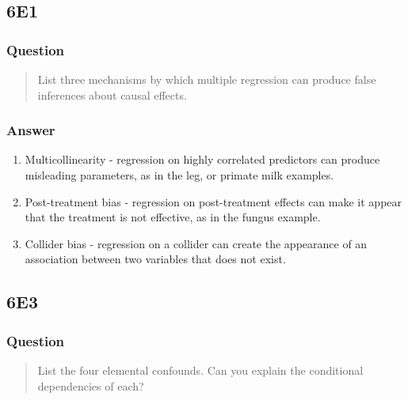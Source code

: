 \documentclass[
]{book}
\begin{document}
\hypertarget{e1-4}{%
\subsection*{6E1}\label{e1-4}}

\hypertarget{question-49}{%
\subsubsection*{Question}\label{question-49}}

\begin{quote}
List three mechanisms by which multiple regression can produce false inferences about causal effects.
\end{quote}

\hypertarget{answer-49}{%
\subsubsection*{Answer}\label{answer-49}}

\begin{enumerate}
\def\labelenumi{\arabic{enumi}.}
\item
  Multicollinearity - regression on highly correlated predictors can produce misleading parameters, as in the leg, or primate milk examples.
\item
  Post-treatment bias - regression on post-treatment effects can make it appear that the treatment is not effective, as in the fungus example.
\item
  Collider bias - regression on a collider can create the appearance of an association between two variables that does not exist.
\end{enumerate}

\hypertarget{e3-4}{%
\subsection*{6E3}\label{e3-4}}

\hypertarget{question-50}{%
\subsubsection*{Question}\label{question-50}}

\begin{quote}
List the four elemental confounds. Can you explain the conditional dependencies of each?
\end{quote}
\end{document}

